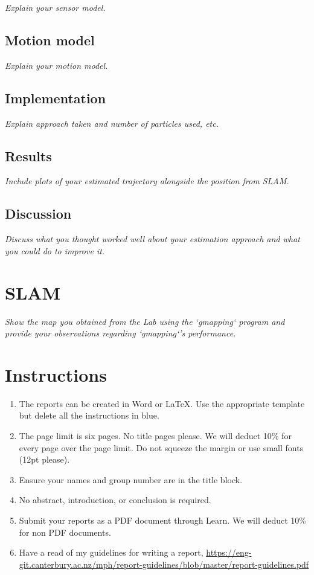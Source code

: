 \documentclass[a4paper,12pt]{article}
\newcommand{\comment}[1]{\emph{\color{blue}#1}}
\begin{document}
\comment{Explain your sensor model.}


\subsection{Motion model}

\comment{Explain your motion model.}


\subsection{Implementation}

\comment{Explain approach taken and number of particles used, etc.}


\subsection{Results}

\comment{Include plots of your estimated trajectory alongside the
  position from SLAM.}


\subsection{Discussion}

\comment{Discuss what you thought worked well about your estimation
  approach and what you could do to improve it.}


\section{SLAM}

\comment{Show the map you obtained from the Lab using the `gmapping`
  program and provide your observations regarding `gmapping`'s
  performance.}

\color{blue}
\section*{Instructions}

\begin{enumerate}
\item The reports can be created in Word or \LaTeX.  Use the
  appropriate template but delete all the instructions in blue.

\item The page limit is six pages.  No title pages please.  We will
  deduct 10\% for every page over the page limit.  Do not squeeze the
  margin or use small fonts (12pt please).

\item Ensure your names and group number are in the title block.

\item No abstract, introduction, or conclusion is required.

\item Submit your reports as a PDF document through Learn.  We will
  deduct 10\% for non PDF documents.

\item Have a read of my guidelines for writing a report,
  \url{https://eng-git.canterbury.ac.nz/mph/report-guidelines/blob/master/report-guidelines.pdf}

\end{enumerate}
\end{document}
